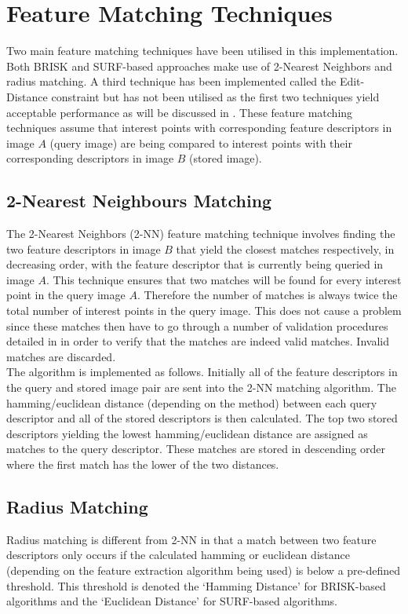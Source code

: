 \documentclass[11pt]{report}
\begin{document}
\section{Feature Matching Techniques}
\label{sec:matchingTechniques}
Two main feature matching techniques have been utilised in this implementation. Both BRISK and SURF-based approaches make use of 2-Nearest Neighbors and radius matching. A third technique has been implemented called the Edit-Distance constraint but has not been utilised as the first two techniques yield acceptable performance as will be discussed in . These feature matching techniques assume that interest points with corresponding feature descriptors in image $A$ (query image) are being compared to interest points with their corresponding descriptors in image $B$ (stored image). \\

\subsection{2-Nearest Neighbours Matching}
\label{sec:knn}
The 2-Nearest Neighbors (2-NN) feature matching technique involves finding the two feature descriptors in image $B$ that yield the closest matches respectively, in decreasing order, with the feature descriptor that is currently being queried in image $A$. This technique ensures that two matches will be found for every interest point in the query image $A$. Therefore the number of matches is always twice the total number of interest points in the query image. This does not cause a problem since these matches then have to go through a number of validation procedures detailed in  in order to verify that the matches are indeed valid matches. Invalid matches are discarded. \\

The algorithm is implemented as follows. Initially all of the feature descriptors in the query and stored image pair are sent into the 2-NN matching algorithm. The hamming/euclidean distance (depending on the method) between each query descriptor and all of the stored descriptors is then calculated. The top two stored descriptors yielding the lowest hamming/euclidean distance are assigned as matches to the query descriptor. These matches are stored in descending order where the first match has the lower of the two distances.\\ 

\subsection{Radius Matching}
\label{sec:radius}
Radius matching is different from 2-NN in that a match between two feature descriptors only occurs if the calculated hamming or euclidean distance (depending on the feature extraction algorithm being used) is below a pre-defined threshold. This threshold is denoted the `Hamming Distance' for BRISK-based algorithms and the `Euclidean Distance' for SURF-based algorithms. \\
\end{document}
